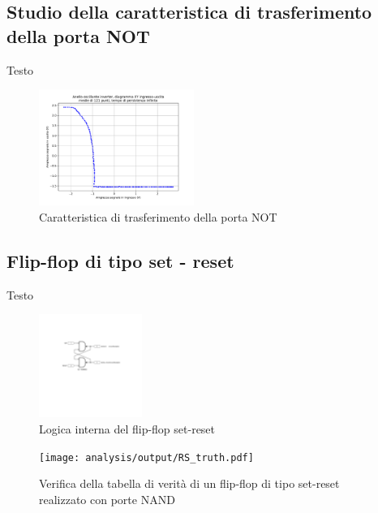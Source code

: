 \documentclass[journal]{IEEEtran}
\begin{document}
\subsection{Studio della caratteristica di trasferimento della porta NOT}
Testo

\begin{figure}[H]%
\begin{center}
\includegraphics[width=0.45\textwidth]{analysis/output/inverter_ring_xy.pdf}
\caption{Caratteristica di trasferimento della porta NOT}
\label{fig:inverter_ring_xy}
\end{center}
\end{figure}


\subsection{Flip-flop di tipo set - reset}
Testo

\begin{figure}[H]%
\begin{center}
\includegraphics[width=0.30\textwidth]{sch-simulations/digital/output/flip-flop-RS.pdf}
\caption{Logica interna del flip-flop set-reset}
\label{fig:circuit_flip_flop}
\end{center}
\end{figure}

\begin{figure}[H]%
\begin{center}
\texttt{[image: analysis/output/RS\_truth.pdf]}
\caption{Verifica della tabella di verità di un flip-flop di tipo set-reset realizzato con porte NAND}
\label{fig:graph_ring_oscillator}
\end{center}
\end{figure}
\end{document}
